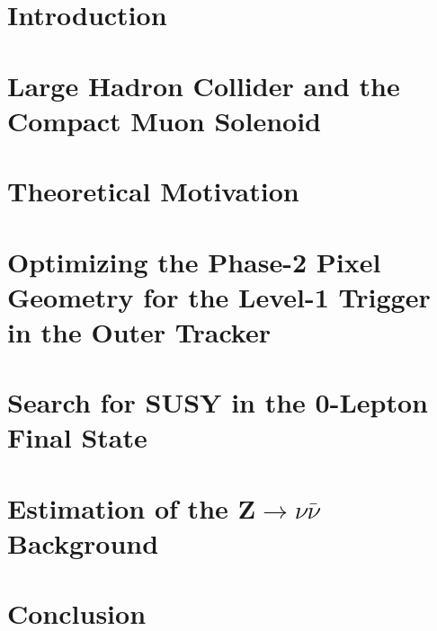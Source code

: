 \documentclass[12pt,twoside,openany]{book}
\begin{document}
\listoffigures

\tableofcontents

\mainmatter
\chapter{Introduction}


\chapter{Large Hadron Collider and the Compact Muon Solenoid}\label{LHCCMS}


\chapter{Theoretical Motivation}\label{theory}


\chapter{Optimizing the Phase-2 Pixel Geometry for the Level-1 Trigger in the Outer Tracker}\label{stubs}


\chapter{Search for SUSY in the 0-Lepton Final State}\label{AnalysisChap}


\chapter{Estimation of the Z$\rightarrow \nu\bar{\nu}$ Background}\label{estimation}


\chapter{Conclusion}\label{conclusion}


\appendix
%

{}

\end{document}
